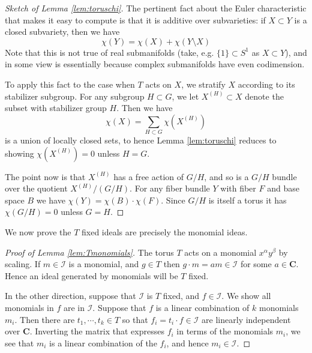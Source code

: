 \documentclass{amsart}[12pt]
\theoremstyle{definition}
\newcommand{\C}{\mathbf{C}}
\newcommand{\II}{\mathcal{I}}
\begin{document}
\begin{proof}[Sketch of Lemma \ref{lem:toruschi}]

  The pertinent fact about the Euler characteristic that makes it easy to compute is that it is additive over subvarieties: if $X\subset Y$ is a closed subvariety, then we have
  \[\chi(Y)=\chi(X)+\chi(Y\setminus X)\]
Note that this is not true of real submanifolds (take, e.g. $\{1\}\subset S^1$ as $X\subset Y$), and in some view is essentially because complex submanifolds have even codimension.



To apply this fact to the case when $T$ acts on $X$, we stratify $X$ according to its stabilizer subgroup.  For any subgroup $H\subset G$, we let $X^{(H)}\subset X$ denote the subset with stabilizer group $H$.  Then we have
\[\chi(X)=\sum_{H\subset G} \chi\left(X^{(H)}\right)\]
is a union of locally closed sets, to hence Lemma \ref{lem:toruschi} reduces to showing $\chi(X^{(H)})=0$ unless $H=G$.

The point now is that $X^{(H)}$ has a free action of $G/H$, and so is a $G/H$ bundle over the quotient $X^{(H)}/(G/H)$.  For any fiber bundle $Y$ with fiber $F$ and base space $B$ we have $\chi(Y)=\chi(B)\cdot \chi(F)$.  Since $G/H$ is itself a torus it has $\chi(G/H)=0$ unless $G=H$.  
\end{proof}


We now prove the $T$ fixed ideals are precisely the monomial ideas.
\begin{proof}[Proof of Lemma \ref{lem:Tmonomials}]
The torus $T$ acts on a monomial $x^\alpha y^\beta$ by scaling.  If $m\in \II$ is a monomial, and $g\in T$ then $g\cdot m=am\in \II$ for some $a\in \C$.  Hence an ideal generated by monomials will be $T$ fixed.  

In the other direction, suppose that $\II$ is $T$ fixed, and $f\in\II$.  We show all monomials in $f$ are in $\II$.  Suppose that $f$ is a linear combination of $k$ monomials $m_i$. Then there are $t_1,\cdots, t_k\in T$ so that $f_i=t_i \cdot f\in \II$ are linearly independent over $\C$. Inverting the matrix that expresses $f_i$ in terms of the monomials $m_i$, we see that $m_i$ is a linear combination of the $f_i$, and hence $m_i\in\II$.
\end{proof}
\end{document}
